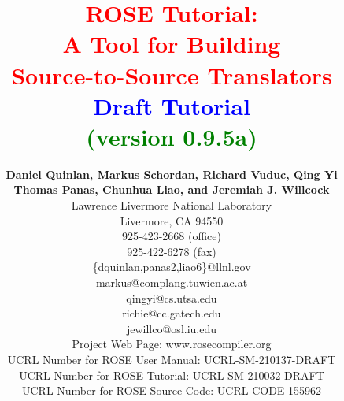 \documentclass[10pt]{book}
\begin{document}
%
%

\frontmatter

\title{ {\bf \textcolor{red}{          ROSE  Tutorial: \\ 
                                     A Tool for Building \\
                                Source-to-Source Translators} \\
                             \textcolor{blue}{Draft Tutorial} \\
                               \textcolor{green}{(version 0.9.5a)} } }

\author{ 
    {\bf Daniel Quinlan, Markus Schordan, Richard Vuduc, Qing Yi} \\
    {\bf Thomas Panas, Chunhua Liao, and Jeremiah J. Willcock} \\
         Lawrence Livermore National Laboratory \\ 
         Livermore, CA  94550 \\
         925-423-2668 (office) \\
         925-422-6278 (fax) \\
         \{dquinlan,panas2,liao6\}@llnl.gov \\
          markus@complang.tuwien.ac.at \\
          qingyi@cs.utsa.edu \\
          richie@cc.gatech.edu \\
          jewillco@osl.iu.edu \\
         Project Web Page: www.rosecompiler.org \\
         UCRL Number for ROSE User Manual: UCRL-SM-210137-DRAFT \\
         UCRL Number for ROSE Tutorial: UCRL-SM-210032-DRAFT \\
         UCRL Number for ROSE Source Code: UCRL-CODE-155962 \\
          \\
          \\
       }
\end{document}
